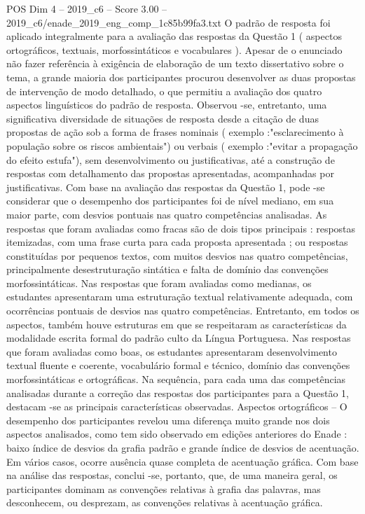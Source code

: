 \begin{textsample}{POS Dim 4 – 2019\_c6 – Score 3.00 – 2019\_c6/enade\_2019\_eng\_comp\_1c85b99fa3.txt}
O padrão de resposta foi aplicado integralmente para a avaliação das respostas da Questão 1 ( aspectos ortográficos, textuais, morfossintáticos e vocabulares ).
Apesar de o enunciado não fazer referência à exigência de elaboração de um texto dissertativo sobre o tema, a grande maioria dos participantes procurou desenvolver as duas propostas de intervenção de modo detalhado, o que permitiu a avaliação dos quatro aspectos linguísticos do padrão de resposta.
Observou -se, entretanto, uma significativa diversidade de situações de resposta desde a citação de duas propostas de ação sob a forma de frases nominais ( exemplo :"esclarecimento à população sobre os riscos ambientais") ou verbais ( exemplo :"evitar a propagação do efeito estufa"), sem desenvolvimento ou justificativas, até a construção de respostas com detalhamento das propostas apresentadas, acompanhadas por justificativas.
Com base na avaliação das respostas da Questão 1, pode -se considerar que o desempenho dos participantes foi de nível mediano, em sua maior parte, com desvios pontuais nas quatro competências analisadas.
As respostas que foram avaliadas como fracas são de dois tipos principais : respostas itemizadas, com uma frase curta para cada proposta apresentada ; ou respostas constituídas por pequenos textos, com muitos desvios nas quatro competências, principalmente desestruturação sintática e falta de domínio das convenções morfossintáticas.
Nas respostas que foram avaliadas como medianas, os estudantes apresentaram uma estruturação textual relativamente adequada, com ocorrências pontuais de desvios nas quatro competências.
Entretanto, em todos os aspectos, também houve estruturas em que se respeitaram as características da modalidade escrita formal do padrão culto da Língua Portuguesa.
Nas respostas que foram avaliadas como boas, os estudantes apresentaram desenvolvimento textual fluente e coerente, vocabulário formal e técnico, domínio das convenções morfossintáticas e ortográficas.
Na sequência, para cada uma das competências analisadas durante a correção das respostas dos participantes para a Questão 1, destacam -se as principais características observadas.
Aspectos ortográficos – O desempenho dos participantes revelou uma diferença muito grande nos dois aspectos analisados, como tem sido observado em edições anteriores do Enade : baixo índice de desvios da grafia padrão e grande índice de desvios de acentuação.
Em vários casos, ocorre ausência quase completa de acentuação gráfica.
Com base na análise das respostas, conclui -se, portanto, que, de uma maneira geral, os participantes dominam as convenções relativas à grafia das palavras, mas desconhecem, ou desprezam, as convenções relativas à acentuação gráfica.

\end{textsample}
